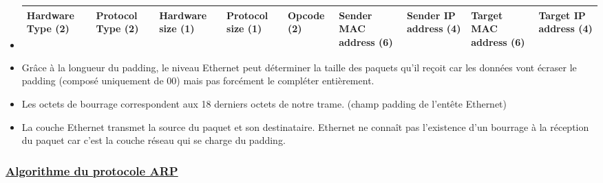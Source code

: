 \documentclass{article}
\begin{document}
\begin{itemize}
	\item 

\begin{tabular}{|p{1.3cm}|p{1.3cm}|p{1.3cm}|p{1.3cm}|p{1.3cm}|p{1.3cm}|p{1.3cm}|p{1.3cm}|p{1.3cm}|}
\hline
Hardware Type (2) &
Protocol Type (2) &
Hardware size (1) &
Protocol size (1) &
Opcode (2) &
Sender MAC address (6) &
Sender IP address (4) &
Target MAC address (6) &
Target IP address (4) \\
\hline
\end{tabular}

	\item Grâce à la longueur du padding, le niveau Ethernet peut déterminer la taille des paquets qu'il reçoit car les données vont écraser le padding (composé uniquement de 00) mais pas forcément le compléter entièrement.
	\item Les octets de bourrage correspondent aux 18 derniers octets de notre trame. (champ padding de l'entête Ethernet)
	\item La couche Ethernet transmet la source du paquet et son destinataire. Ethernet ne connaît pas l'existence d'un bourrage à la réception du paquet car c'est la couche réseau qui se charge du  padding.
\end{itemize}

\subsubsection*{\underline{Algorithme du protocole ARP}}
\end{document}
